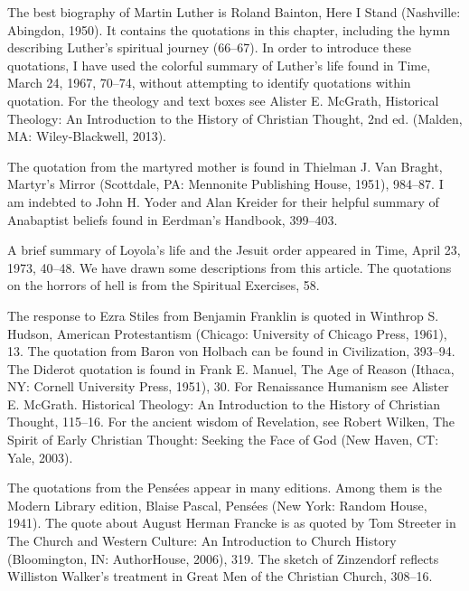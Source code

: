 \begin{notelist}
\entry The best biography of Martin Luther is Roland Bainton, Here I Stand (Nashville: Abingdon,
  1950). It contains the quotations in this chapter, including the hymn describing Luther’s
  spiritual journey (66–67). In order to introduce these quotations, I have used the colorful
  summary of Luther’s life found in Time, March 24, 1967, 70–74, without attempting to identify
  quotations within quotation.
\entry For the theology and text boxes see Alister E. McGrath, Historical Theology: An Introduction
  to the History of Christian Thought, 2nd ed. (Malden, MA: Wiley-Blackwell, 2013).
\end{notelist}

\begin{notelist}
\entry The quotation from the martyred mother is found in Thielman J. Van Braght, Martyr’s Mirror
  (Scottdale, PA: Mennonite Publishing House, 1951), 984–87.
\entry I am indebted to John H. Yoder and Alan Kreider for their helpful summary of Anabaptist
  beliefs found in Eerdman’s Handbook, 399–403.
\end{notelist}

\begin{notelist}
\entry A brief summary of Loyola’s life and the Jesuit order appeared in Time, April 23, 1973,
  40–48. We have drawn some descriptions from this article.
\entry The quotations on the horrors of hell is from the Spiritual Exercises, 58.
\end{notelist}

\begin{notelist}
\entry The response to Ezra Stiles from Benjamin Franklin is quoted in Winthrop S. Hudson, American
  Protestantism (Chicago: University of Chicago Press, 1961), 13.
\entry The quotation from Baron von Holbach can be found in Civilization, 393–94.
\entry The Diderot quotation is found in Frank E. Manuel, The Age of Reason (Ithaca, NY: Cornell
  University Press, 1951), 30.
\entry For Renaissance Humanism see Alister E. McGrath. Historical Theology: An Introduction to the
  History of Christian Thought, 115–16.
\entry For the ancient wisdom of Revelation, see Robert Wilken, The Spirit of Early Christian
  Thought: Seeking the Face of God (New Haven, CT: Yale, 2003).
\end{notelist}

\begin{notelist}
\entry The quotations from the Pensées appear in many editions. Among them is the Modern Library
  edition, Blaise Pascal, Pensées (New York: Random House, 1941).
\entry The quote about August Herman Francke is as quoted by Tom Streeter in The Church and Western
  Culture: An Introduction to Church History (Bloomington, IN: AuthorHouse, 2006), 319.
\entry The sketch of Zinzendorf reflects Williston Walker’s treatment in Great Men of the Christian
  Church, 308–16.
\end{notelist}

